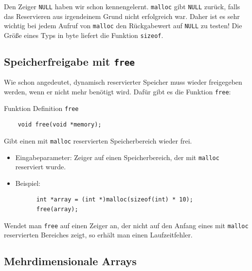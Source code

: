 Den Zeiger \verb|NULL| haben wir schon kennengelernt. 
\verb|malloc| gibt \verb|NULL| zurück, falls das Reservieren aus irgendeinem Grund nicht erfolgreich war.
Daher ist es sehr wichtig bei jedem Aufruf von \verb|malloc| den Rückgabewert auf \verb|NULL| zu testen!
Die Größe eines Typs in byte liefert die Funktion \verb|sizeof|.

\subsection{Speicherfreigabe mit \texttt{free}}

Wie schon angedeutet, dynamisch reservierter Speicher muss wieder freigegeben werden, wenn er nicht mehr benötigt wird.
Dafür gibt es die Funktion \verb|free|:
\begin{mydefinitionblock}{Funktion Definition \texttt{free}}
  \begin{lstlisting}
    void free(void *memory);
  \end{lstlisting}
  Gibt einen mit \verb|malloc| reservierten Speicherbereich wieder frei.
  \begin{itemize}
  \item Eingabeparameter: Zeiger auf einen Speicherbereich, der mit \verb|malloc| reserviert wurde.
  \item Beispiel:
    \begin{lstlisting}
      int *array = (int *)malloc(sizeof(int) * 10);
      free(array);
    \end{lstlisting}
  \end{itemize}
\end{mydefinitionblock}
Wendet man \verb|free| auf einen Zeiger an, der nicht auf den Anfang eines mit \verb|malloc| reservierten Bereiches zeigt, so erhält man einen Laufzeitfehler.

\subsection{Mehrdimensionale Arrays}

